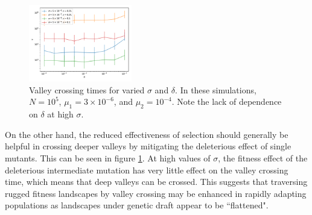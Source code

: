 \documentclass[10pt,twocolumn,twoside]{gsajnl}
\begin{document}
\begin{spacing}{1.5}

\begin{figure}[t]
\includegraphics[width=0.4\textwidth]{Figures/julia_sigma_delta.pdf}
\caption{Valley crossing times for varied $\sigma$ and $\delta$. In these simulations, $N = 10^5$, $\mu_1 = 3 \times 10^{-6}$, and $\mu_2 = 10^{-4}$. Note the lack of dependence on $\delta$ at high $\sigma$.}
\label{fig:sigma_delta}
\end{figure}

On the other hand, the reduced effectiveness of selection should generally be helpful in crossing deeper valleys by mitigating the deleterious effect of single mutants.
This can be seen in figure \ref{fig:sigma_delta}.
At high values of $\sigma$, the fitness effect of the deleterious intermediate mutation has very little effect on the valley crossing time, which means that deep valleys can be crossed.
This suggests that traversing rugged fitness landscapes by valley crossing may be enhanced in rapidly adapting populations as landscapes under genetic draft appear to be ``flattened".


\end{spacing}
\end{document}
